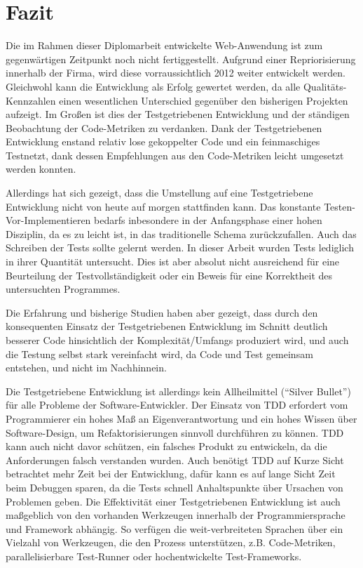 \section{Fazit}

Die im Rahmen dieser Diplomarbeit entwickelte Web-Anwendung ist zum gegenwärtigen Zeitpunkt noch nicht fertiggestellt. Aufgrund einer Repriorisierung innerhalb der Firma, wird diese vorraussichtlich 2012 weiter entwickelt werden. Gleichwohl kann die Entwicklung als Erfolg gewertet werden, da alle Qualitäts-Kennzahlen einen wesentlichen Unterschied gegenüber den bisherigen Projekten aufzeigt. Im Großen ist dies der Testgetriebenen Entwicklung und der ständigen Beobachtung der Code-Metriken zu verdanken. Dank der Testgetriebenen Entwicklung enstand relativ lose gekoppelter Code und ein feinmaschiges Testnetzt, dank dessen Empfehlungen aus den Code-Metriken leicht umgesetzt werden konnten.

Allerdings hat sich gezeigt, dass die Umstellung auf eine Testgetriebene Entwicklung nicht von heute auf morgen stattfinden kann. Das 
konstante Testen-Vor-Implementieren bedarfs inbesondere in der Anfangsphase einer hohen Disziplin, da es zu leicht ist, in das traditionelle Schema zurückzufallen. Auch das Schreiben der Tests sollte gelernt werden. In dieser Arbeit wurden Tests lediglich in ihrer Quantität untersucht. Dies ist aber absolut nicht ausreichend für eine Beurteilung der Testvollständigkeit oder ein Beweis für eine Korrektheit des untersuchten Programmes. 

Die Erfahrung und bisherige Studien haben aber gezeigt, dass durch den konsequenten Einsatz der Testgetriebenen Entwicklung im Schnitt deutlich besserer Code hinsichtlich der Komplexität/Umfangs produziert wird, und auch die Testung selbst stark vereinfacht wird, da Code und Test gemeinsam entstehen, und nicht im Nachhinnein.

Die Testgetriebene Entwicklung ist allerdings kein Allheilmittel ("`Silver Bullet"') für alle Probleme der Software-Entwickler. Der Einsatz von TDD erfordert vom Programmierer ein hohes Maß an Eigenverantwortung und ein hohes Wissen über Software-Design, um Refaktorisierungen sinnvoll durchführen zu können. TDD kann auch nicht davor schützen, ein falsches Produkt zu entwickeln, da die Anforderungen falsch verstanden wurden. Auch benötigt TDD auf Kurze Sicht betrachtet mehr Zeit bei der Entwicklung, dafür kann es auf lange Sicht Zeit beim Debuggen sparen, da die Tests schnell Anhaltspunkte über Ursachen von Problemen geben.
Die Effektivität einer Testgetriebenen Entwicklung ist auch maßgeblich von den vorhanden Werkzeugen innerhalb der Programmiersprache und Framework abhängig. So verfügen die weit-verbreiteten Sprachen über ein Vielzahl von Werkzeugen, die den Prozess unterstützen, z.B. Code-Metriken, parallelisierbare Test-Runner oder hochentwickelte Test-Frameworks.

